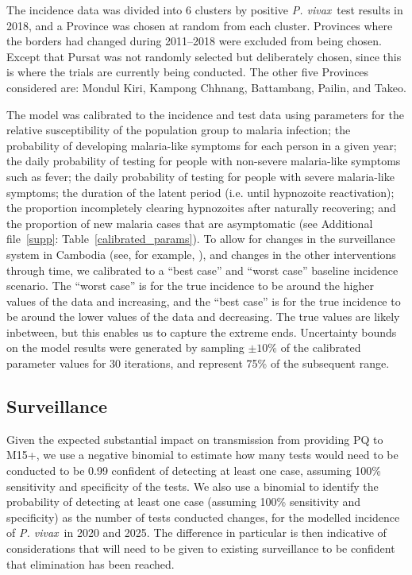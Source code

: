 \documentclass[doublespacing]{bmcart}
\newcommand{\pv}{\textit{P. vivax}}
\begin{document}
The incidence data was divided into 6 clusters by positive \pv~test results in 2018, and a Province was chosen at random from each cluster. Provinces where the borders had changed during 2011--2018 were excluded from being chosen. Except that Pursat was not randomly selected but deliberately chosen, since this is where the trials are currently being conducted. The other five Provinces considered are: Mondul Kiri, Kampong Chhnang, Battambang, Pailin, and Takeo. 

The model was calibrated to the incidence and test data using parameters for the relative susceptibility of the population group to malaria infection; the probability of developing malaria-like symptoms for each person in a given year; the daily probability of testing for people with non-severe malaria-like symptoms such as fever; the daily probability of testing for people with severe malaria-like symptoms; the duration of the latent period (i.e. until hypnozoite reactivation); the proportion incompletely clearing hypnozoites after naturally recovering; and the proportion of new malaria cases that are asymptomatic (see Additional file~\ref{supp}: Table~\ref{calibrated_params}). To allow for changes in the surveillance system in Cambodia (see, for example, \cite{Pengby}), and changes in the other interventions through time, we calibrated to a ``best case'' and ``worst case'' baseline incidence scenario. The ``worst case'' is for the true incidence to be around the higher values of the data and increasing, and the ``best case'' is for the true incidence to be around the lower values of the data and decreasing. The true values are likely inbetween, but this enables us to capture the extreme ends. Uncertainty bounds on the model results were generated by sampling $\pm10\%$ of the calibrated parameter values for 30 iterations, and represent 75\% of the subsequent range.

 


\subsection*{Surveillance}
Given the expected substantial impact on transmission from providing PQ to M15+, we use a negative binomial to estimate how many tests would need to be conducted to be 0.99 confident of detecting at least one case, assuming 100\% sensitivity and specificity of the tests. We also use a binomial to identify the probability of detecting at least one case (assuming 100\% sensitivity and specificity) as the number of tests conducted changes, for the modelled incidence of \pv~in 2020 and 2025. The difference in particular is then indicative of considerations that will need to be given to existing surveillance to be confident that elimination has been reached.
\end{document}
